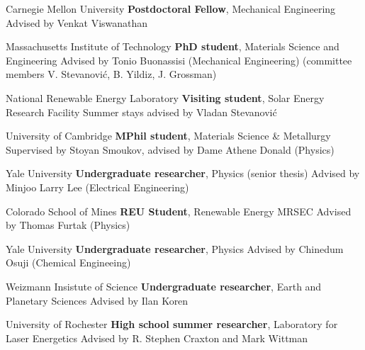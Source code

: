 	{Carnegie Mellon University}
	{\textbf{Postdoctoral Fellow}, Mechanical Engineering}
	{Advised by Venkat Viswanathan}

\vspace{-3mm}
	{Massachusetts Institute of Technology}
	{\textbf{PhD student}, Materials Science and Engineering}
    {Advised by Tonio Buonassisi (Mechanical Engineering) (committee members V. Stevanovi\'c, B. Yildiz, J. Grossman)}

\vspace{-3mm}
    {National Renewable Energy Laboratory}
    {\textbf{Visiting student}, Solar Energy Research Facility}
    {Summer stays advised by Vladan Stevanovi\'c}

\vspace{-3mm}
    {University of Cambridge}
    {\textbf{MPhil student}, Materials Science \& Metallurgy}
    {Supervised by Stoyan Smoukov, advised by Dame Athene Donald (Physics)}

\vspace{-3mm}
    {Yale University}
    {\textbf{Undergraduate researcher}, Physics (senior thesis)}
    {Advised by Minjoo Larry Lee (Electrical Engineering)}

\vspace{-3mm}
    {Colorado School of Mines}
    {\textbf{REU Student}, Renewable Energy MRSEC}
    {Advised by Thomas Furtak (Physics)}

\vspace{-3mm}
    {Yale University}
    {\textbf{Undergraduate researcher}, Physics}
    {Advised by Chinedum Osuji (Chemical Engineeing)}

\vspace{-3mm}
    {Weizmann Insistute of Science}
    {\textbf{Undergraduate researcher}, Earth and Planetary Sciences}
    {Advised by Ilan Koren}

\vspace{-3mm}
    {University of Rochester}
    {\textbf{High school summer researcher}, Laboratory for Laser Energetics}
    {Advised by R. Stephen Craxton and Mark Wittman}